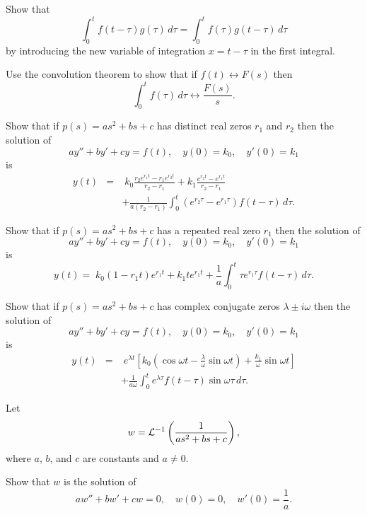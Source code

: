 \begin{exerciselist}
  \item\label{exer:8.6.6} Show that
  \[
    \int_{0}^{t}f(t-\tau)g(\tau)\,d\tau=\int_{0}^{t}f(\tau)g(t-\tau)\,d\tau
  \]
  by introducing the new variable of integration $x=t-\tau$ in the first integral.

  \item\label{exer:8.6.7} Use the convolution theorem to show that if $f(t)\leftrightarrow F(s)$
        then
  \[
    \int_{0}^{t}f(\tau)\,d\tau\leftrightarrow\frac{F(s)}{s}.
  \]

  \item\label{exer:8.6.8} Show that if $p(s)=as^{2}+bs+c$ has distinct real zeros $r_{1}$ and
        $r_{2}$ then the solution of
  \[
    ay''+by'+cy=f(t),\quad y(0)=k_{0},\quad y'(0)=k_{1}
  \]
  is
  \begin{eqnarray*}
    y(t) & = & \;k_{0}\frac{r_{2}e^{r_{1}t}-r_{1}e^{r_{2}t}}{r_{2}-r_{1}}+k_{1}\frac{e^{r_{2}t}-e^{r_{1}t}}{r_{2}-r_{1}} \\
         &   & +\frac{1}{a(r_{2}-r_{1})}\int_{0}^{t}(e^{r_{2}\tau}-e^{r_{1}\tau})f(t-\tau)\,d\tau.
  \end{eqnarray*}

  \item\label{exer:8.6.9} Show that if $p(s)=as^{2}+bs+c$ has a repeated real zero $r_{1}$ then the
        solution of
  \[
    ay''+by'+cy=f(t),\quad y(0)=k_{0},\quad y'(0)=k_{1}
  \]
  is
  \[
    y(t)=\;k_{0}(1-r_{1}t)e^{r_{1}t}+k_{1}te^{r_{1}t}+\frac{1}{a}\int_{0}^{t}\tau e^{r_{1}\tau}f(t-\tau)\,d\tau.
  \]

  \item\label{exer:8.6.10} Show that if $p(s)=as^{2}+bs+c$ has complex conjugate zeros
        $\lambda\pm i\omega$ then the solution of
  \[
    ay''+by'+cy=f(t),\quad y(0)=k_{0},\quad y'(0)=k_{1}
  \]
  is
  \begin{eqnarray*}
    y(t) & = & \;e^{\lambda t}\left[k_{0}(\cos\omega t-\frac{\lambda}{\omega}\sin\omega t)+\frac{k_{1}}{\omega}\sin\omega t\right] \\
         &   & +\frac{1}{a\omega}\int_{0}^{t}e^{\lambda \tau}f(t-\tau)\sin\omega\tau\,d\tau.
  \end{eqnarray*}

  \item\label{exer:8.6.11} Let
  \[
    w={\cal L}^{-1}\left(\frac{1}{as^{2}+bs+c}\right),
  \]
  where $a$, $b$, and $c$ are constants and $a\ne0$.
  \begin{alist}
    \item %
    Show that $w$ is the solution of
    \[
      aw''+bw'+cw=0,\quad w(0)=0,\quad w'(0)=\frac{1}{a}.
    \]


\end{alist}
\end{exerciselist}
